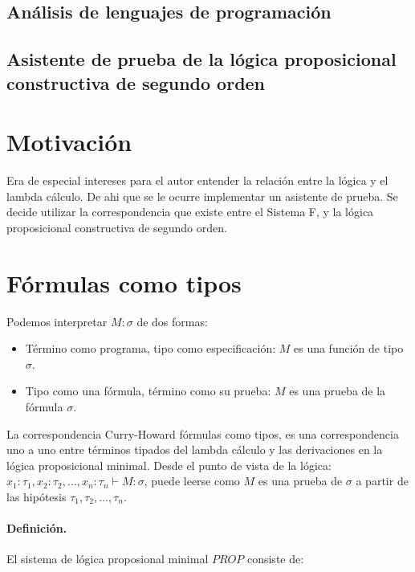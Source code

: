 \documentclass[a4paper,11pt]{article}
\title{}
\author{}
\begin{document}
\maketitle

\begin{center}
\section*{Análisis de lenguajes de programación} 
\subsection*{Asistente de prueba de la lógica proposicional constructiva de segundo orden}
\end{center}

\newpage{\pagestyle{empty}\cleardoublepage}


\section{Motivación}
Era de especial intereses para el autor entender la relación entre la lógica y el lambda cálculo.
De ahi que se le ocurre implementar un asistente de prueba. Se decide utilizar la correspondencia
que existe entre el Sistema F, y la lógica proposicional constructiva de segundo orden.
 
\section{Fórmulas como tipos}
Podemos interpretar $M : \sigma$ de dos formas:
\begin{itemize}
  \item Término como programa, tipo como especificación: $M$ es una función de tipo $\sigma$.
  \item Tipo como una fórmula, término como su prueba: $M$ es una prueba de la fórmula $\sigma$.
\end{itemize}

La correspondencia Curry-Howard fórmulas como tipos, es una correspondencia uno a uno entre términos
tipados del lambda cálculo y las derivaciones en la lógica proposicional minimal.
Desde el punto de vista de la lógica: $x_{1}:\tau_{1}, x_{2}:\tau_{2}, \ldots, x_{n}:\tau_{n} \vdash M : \sigma$,
puede leerse como $M$ es una prueba de $\sigma$ a partir de las hipótesis $\tau_{1}, \tau_{2}, \ldots, \tau_{n}$.

\paragraph{Definición.}  El sistema de lógica proposional minimal $PROP$ consiste de:
\end{document}
